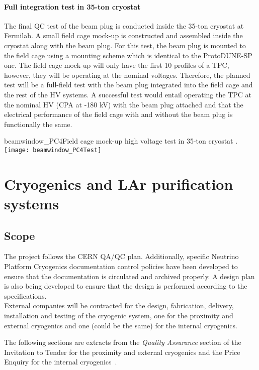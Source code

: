 \paragraph{Full integration test in 35-ton cryostat}
The final QC test of the beam plug is conducted inside the 35-ton cryostat at Fermilab. A small field cage mock-up is constructed and assembled inside the cryostat along with the beam plug. For this test, the beam plug is mounted to the field cage using a mounting scheme which is identical to the ProtoDUNE-SP one. The field cage mock-up will only have the first 10 profiles of a TPC, however, they will be operating at the nominal voltages. Therefore, the planned test will be a full-field test with the beam plug integrated into the field cage and the rest of the HV systems. A successful test would entail operating the TPC at the nominal HV (CPA at -180 kV) with the beam plug attached and that the electrical performance of the field cage with and without the beam plug is functionally the same.

\begin{cdrfigure}{beamwindow_PC4}{Field cage mock-up high voltage test in 35-ton cryostat .}
  \texttt{[image: beamwindow\_PC4Test]}
\end{cdrfigure}

\section{Cryogenics and LAr purification systems}

\subsection{Scope}

The project follows the CERN QA/QC plan. Additionally, specific Neutrino Platform Cryogenics documentation control policies have been developed to ensure that the documentation is circulated and archived properly. A design plan is also being developed to ensure that the design is performed according to the specifications.\\
%
External companies will be contracted for the design, fabrication, delivery, installation and testing of the cryogenic system, one for the proximity and external cryogenics and one (could be the same) for the internal cryogenics.

The following sections are extracts from the \textit{Quality Assurance} section of the Invitation to Tender for the proximity and external cryogenics and the Price Enquiry for the internal cryogenics~\cite{invit-tender-cryo}.

